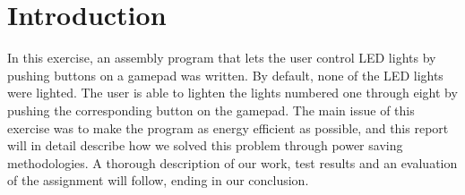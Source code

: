 \section{Introduction}

In this exercise, an assembly program that lets the user control LED lights by pushing buttons on a gamepad was written.
By default, none of the LED lights were lighted.
The user is able to lighten the lights numbered one through eight by pushing the corresponding button on the gamepad.
The main issue of this exercise was to make the program as energy efficient as possible, and this report will in detail describe how we solved this problem through power saving methodologies.
A thorough description of our work, test results and an evaluation of the assignment will follow, ending in our conclusion.
